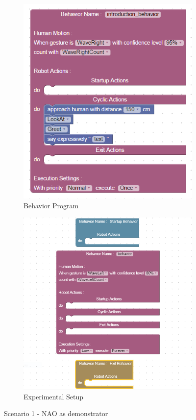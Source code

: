 \documentclass{llncs}
\begin{document}
\begin{figure}
\centering
\begin{subfigure}[t]{0.48\textwidth}
\includegraphics[width=\textwidth]{../thesis/assets/scenario1.png}
\caption[Behavior Program]{Behavior Program}
\label{fig:scenario1_program}
\end{subfigure}
\begin{subfigure}[t]{0.48\textwidth}
\includegraphics[width=\textwidth]{../thesis/assets/program_block.png}
\caption[Block Implementation]{Experimental Setup}
\label{fig:scenario1_setup}
\end{subfigure}
\caption[Program Structure]{Scenario 1 - NAO as demonstrator}
\label{fig:program}
\end{figure}
\end{document}
